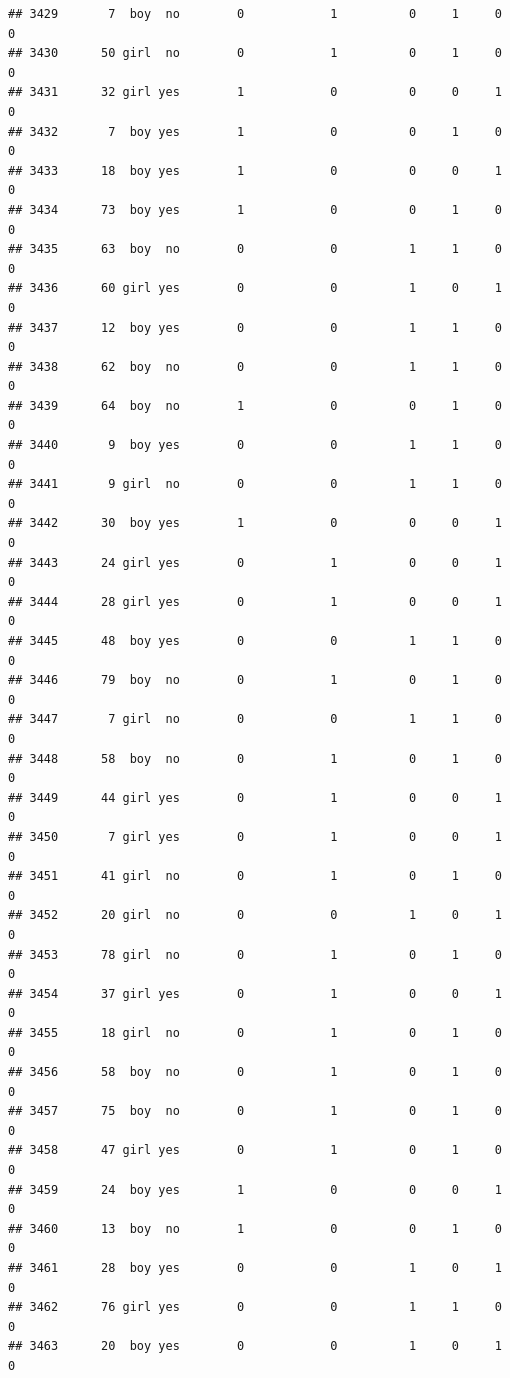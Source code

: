 \documentclass[man]{apa6}
\begin{document}
\begin{verbatim}
## 3429       7  boy  no        0            1          0     1     0     0
## 3430      50 girl  no        0            1          0     1     0     0
## 3431      32 girl yes        1            0          0     0     1     0
## 3432       7  boy yes        1            0          0     1     0     0
## 3433      18  boy yes        1            0          0     0     1     0
## 3434      73  boy yes        1            0          0     1     0     0
## 3435      63  boy  no        0            0          1     1     0     0
## 3436      60 girl yes        0            0          1     0     1     0
## 3437      12  boy yes        0            0          1     1     0     0
## 3438      62  boy  no        0            0          1     1     0     0
## 3439      64  boy  no        1            0          0     1     0     0
## 3440       9  boy yes        0            0          1     1     0     0
## 3441       9 girl  no        0            0          1     1     0     0
## 3442      30  boy yes        1            0          0     0     1     0
## 3443      24 girl yes        0            1          0     0     1     0
## 3444      28 girl yes        0            1          0     0     1     0
## 3445      48  boy yes        0            0          1     1     0     0
## 3446      79  boy  no        0            1          0     1     0     0
## 3447       7 girl  no        0            0          1     1     0     0
## 3448      58  boy  no        0            1          0     1     0     0
## 3449      44 girl yes        0            1          0     0     1     0
## 3450       7 girl yes        0            1          0     0     1     0
## 3451      41 girl  no        0            1          0     1     0     0
## 3452      20 girl  no        0            0          1     0     1     0
## 3453      78 girl  no        0            1          0     1     0     0
## 3454      37 girl yes        0            1          0     0     1     0
## 3455      18 girl  no        0            1          0     1     0     0
## 3456      58  boy  no        0            1          0     1     0     0
## 3457      75  boy  no        0            1          0     1     0     0
## 3458      47 girl yes        0            1          0     1     0     0
## 3459      24  boy yes        1            0          0     0     1     0
## 3460      13  boy  no        1            0          0     1     0     0
## 3461      28  boy yes        0            0          1     0     1     0
## 3462      76 girl yes        0            0          1     1     0     0
## 3463      20  boy yes        0            0          1     0     1     0

\end{verbatim}
\end{document}
